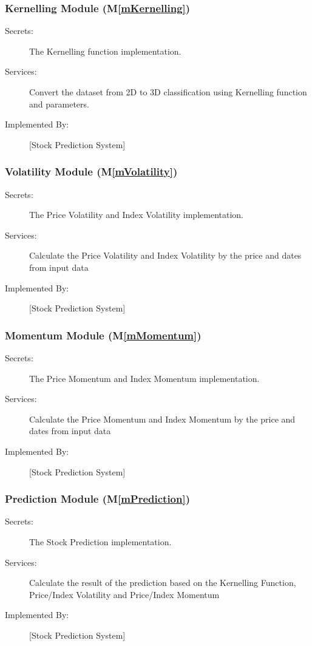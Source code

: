 \documentclass[12pt, titlepage]{article}
\newcommand{\mref}[1]{M\ref{#1}}
\begin{document}
\subsubsection{Kernelling Module (\mref{mKernelling})}

\begin{description}
\item[Secrets:] The Kernelling function implementation.
\item[Services:] Convert the dataset from 2D to 3D classification using Kernelling function and parameters.
\item[Implemented By:] [Stock Prediction System]
\end{description}

\subsubsection{Volatility Module (\mref{mVolatility})}

\begin{description}
\item[Secrets:] The Price Volatility and Index Volatility implementation.
\item[Services:] Calculate the Price Volatility and Index Volatility by the price and dates from input data
\item[Implemented By:] [Stock Prediction System]
\end{description}


\subsubsection{Momentum Module (\mref{mMomentum})}

\begin{description}
\item[Secrets:] The Price Momentum and Index Momentum implementation.
\item[Services:]Calculate the Price Momentum and Index Momentum by the price and dates from input data
\item[Implemented By:] [Stock Prediction System]
\end{description}


\subsubsection{Prediction Module (\mref{mPrediction})}
\begin{description}
\item[Secrets:]The Stock Prediction implementation.
\item[Services:] Calculate the result of the prediction based on the Kernelling Function, Price/Index Volatility and Price/Index Momentum
\item[Implemented By:] [Stock Prediction System]
\end{description}
\end{document}
